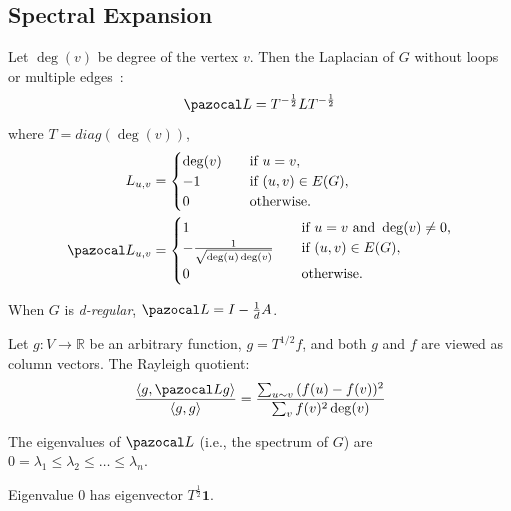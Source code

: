 \subsection{Spectral Expansion}

Let $\deg(v)$ be degree of the vertex $v$. Then the Laplacian of $G$ without loops or multiple edges~\cite{chu97}:
\begin{equation}
    \Laplacian=T^{-\frac{1}{2}}LT^{-\frac{1}{2}}
\end{equation}
where $T=diag(\deg(v))$,
\begin{align}
    L_{u,v}&=
    \begin{cases}
        \deg(v) & \quad \text{if } u=v \text{,}\\
        -1      & \quad \text{if } (u,v)\in E(G),\\
        0       & \quad \text{otherwise.}
    \end{cases}\\
    \Laplacian_{u,v}&=
    \begin{cases}
        1                                   & \quad \text{if } u=v \text{ and } \deg(v) \neq 0 \text{,}\\
        -\frac{1}{\sqrt{\deg(u)\deg(v)}}    & \quad \text{if } (u,v)\in E(G),\\
        0                                   & \quad \text{otherwise.}
    \end{cases}
\end{align}


When $G$ is \textit{d-regular}, $\Laplacian=I-\frac{1}{d}A$.

Let $g:V\to\mathbb{R}$ be an arbitrary function, $g=T^{1/2}f$,
and both $g$ and $f$ are viewed as column vectors.
The Rayleigh quotient:
\begin{equation}
    \frac{\langle g,\Laplacian g \rangle}{\langle g,g \rangle}
    =\frac{\sum_{u \sim v}{(f(u)-f(v))^2}}{\sum_{v}{f(v)^2\deg(v)}}
\end{equation}

The eigenvalues of $\Laplacian$ (i.e., the spectrum of $G$) are $0=\lambda_1 \leq \lambda_2 \leq \dots \leq \lambda_{n}$.

Eigenvalue $0$ has eigenvector $T^{\frac{1}{2}}\mathbf{1}$.

